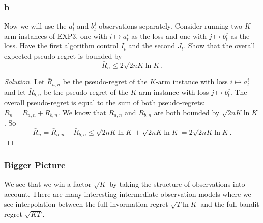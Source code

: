 \documentclass[10pt, a4paper, twoside]{amsart}
\theoremstyle{plain}
\newenvironment{solution}
               {\let\oldqedsymbol=\qedsymbol
                \renewcommand{\qedsymbol}{$\blacktriangleleft$}
                \begin{proof}[Solution]}
               {\end{proof}
                \renewcommand{\qedsymbol}{\oldqedsymbol}}
\begin{document}
\subsubsection*{b} Now we will use the $a_t^i$ and $b_t^j$ observations separately. Consider running two $K$-arm instances of EXP$3$, one with $i \mapsto a_t^i$ as the loss and one with $j \mapsto b_t^j$ as the loss. Have the first algorithm control $I_t$ and the second $J_t$. Show that the overall expected pseudo-regret is bounded by 
\begin{equation*}
    \bar{R}_n \leq 2 \sqrt{2nK\ln K}.
\end{equation*}
\begin{solution}
  Let $\bar{R}_{a,n}$ be the pseudo-regret of the $K$-arm instance with loss $i \mapsto a_t^i$ and let $\bar{R}_{b,n}$ be the pseudo-regret of the $K$-arm instance with loss $j \mapsto b_t^j$.
  The overall pseudo-regret is equal to the sum of both pseudo-regrets: $\bar{R}_n = \bar{R}_{a,n} + \bar{R}_{b,n}$. We know that $\bar{R}_{a,n}$ and $\bar{R}_{b,n}$ are both bounded by $\sqrt{2nK \ln K}$. So
  \begin{equation*}
    \bar{R}_n = \bar{R}_{a,n} + \bar{R}_{b,n} \leq \sqrt{2nK \ln K} + \sqrt{2nK \ln K} = 2\sqrt{2nK \ln K}.
\end{equation*}
\end{solution}
\subsubsection*{Bigger Picture} We see that we win a factor $\sqrt{K}$ by taking the structure of observations into account. There are many interesting intermediate observation models where we see interpolation between the full invormation regret $\sqrt{T \ln K}$ and the full bandit regret $\sqrt{KT}$.
\end{document}
